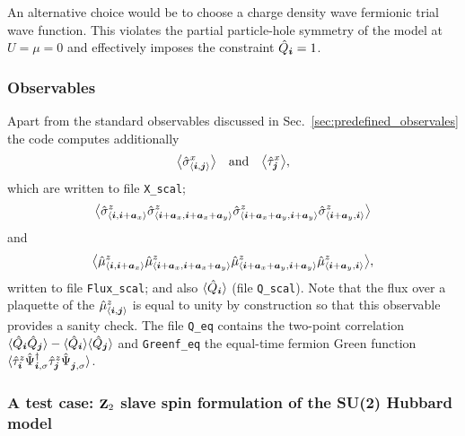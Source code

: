 An alternative  choice would  be to choose a  charge density wave  fermionic trial wave function.     This   violates the partial particle-hole symmetry of the model at $U=\mu=0$ and effectively imposes the constraint $\hat{Q}_{\boldsymbol{i}} =1 $.

\subsubsection{Observables} 
Apart from the  standard  observables discussed in Sec.~\ref{sec:predefined_observales}  the code computes additionally  
\begin{equation*} 
	\big\langle  \hat{\sigma}^{x}_{ \langle \boldsymbol{i},\boldsymbol{j} \rangle } \big\rangle    \quad\text{and}\quad  \big\langle  \hat{\tau}^{x}_{ \boldsymbol{j}  } \big\rangle,
\end{equation*}
which are written to file  \texttt{X\_scal}; 
\begin{equation*}
	\big\langle  \hat{\sigma}^{z}_{ \langle \boldsymbol{i},\boldsymbol{i} + \boldsymbol{a}_x \rangle }   \hat{\sigma}^{z}_{ \langle \boldsymbol{i} + \boldsymbol{a}_x ,\boldsymbol{i} + \boldsymbol{a}_x +  \boldsymbol{a}_y   \rangle }  
	\hat{\sigma}^{z}_{ \langle \boldsymbol{i}+ \boldsymbol{a}_x +  \boldsymbol{a}_y ,\boldsymbol{i} + \boldsymbol{a}_y \rangle }   \hat{\sigma}^{z}_{ \langle \boldsymbol{i} + \boldsymbol{a}_y,\boldsymbol{i}  \rangle }   \big\rangle
\end{equation*}
	and
\begin{equation*}
	\big\langle  \hat{\mu}^{z}_{ \langle \boldsymbol{i},\boldsymbol{i} + \boldsymbol{a}_x \rangle }   \hat{\mu}^{z}_{ \langle \boldsymbol{i} + \boldsymbol{a}_x ,\boldsymbol{i} + \boldsymbol{a}_x +  \boldsymbol{a}_y   \rangle }  
	\hat{\mu}^{z}_{ \langle \boldsymbol{i}+ \boldsymbol{a}_x +  \boldsymbol{a}_y ,\boldsymbol{i} + \boldsymbol{a}_y \rangle }   \hat{\mu}^{z}_{ \langle  \boldsymbol{i} + \boldsymbol{a}_y,\boldsymbol{i}  \rangle }   \big\rangle,
\end{equation*}
written to file \texttt{Flux\_scal}; and also $ \langle \hat{Q}_{\boldsymbol{i}} \rangle $ (file \texttt{Q\_scal}).  Note that the flux over a plaquette  of the $\hat{\mu}^{z}_{ \langle \boldsymbol{i},\boldsymbol{j} \rangle  } $   is equal to unity by construction  so that this observable  provides a sanity check.    The file \texttt{Q\_eq} contains the two-point correlation $ \langle \hat{Q}_{\boldsymbol{i}} \hat{Q}_{\boldsymbol{j}} \rangle -  \langle \hat{Q}_{\boldsymbol{i}} \rangle \langle \hat{Q}_{\boldsymbol{j}} \rangle $  and \texttt{Greenf\_eq}  the equal-time fermion   Green function 
$ \langle  \hat{\tau}^{z}_{\ve{i}}  \hat{\Psi}^{\dagger}_{\ve{i},\sigma}  \hat{\tau}^{z}_{\ve{j}}  \hat{\Psi}^{\phantom\dagger}_{\ve{j},\sigma}   \rangle $.


\subsubsection{A test case: $\mathbf{Z}_{2}$ slave spin formulation of the SU(2) Hubbard model }

